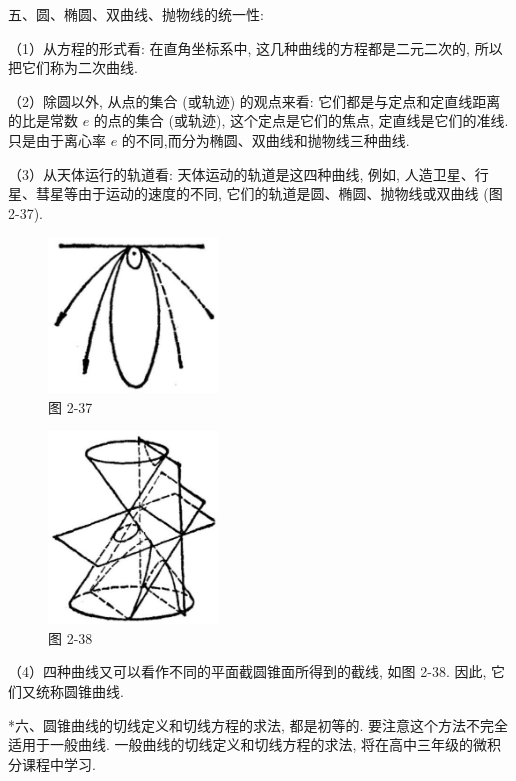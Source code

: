\documentclass[lang=cn,newtx,10pt,scheme=chinese]{elegantbook}
\begin{document}
五、圆、椭圆、双曲线、抛物线的统一性:

（1）从方程的形式看: 在直角坐标系中, 这几种曲线的方程都是二元二次的, 所以把它们称为二次曲线.

（2）除圆以外, 从点的集合 (或轨迹) 的观点来看: 它们都是与定点和定直线距离的比是常数 \(e\) 的点的集合 (或轨迹), 这个定点是它们的焦点, 定直线是它们的准线. 只是由于离心率 \(e\) 的不同,而分为椭圆、双曲线和抛物线三种曲线.

（3）从天体运行的轨道看: 天体运动的轨道是这四种曲线, 例如, 人造卫星、行星、彗星等由于运动的速度的不同, 它们的轨道是圆、椭圆、抛物线或双曲线 (图 2-37).

\begin{figure}[h]
  \centering
  \includegraphics[max width=0.4\textwidth]{images/01912cc2-ffb6-728e-9ae7-b113ff05c64b_128_103138.jpg}
  \caption{图 2-37}
\end{figure}



\begin{figure}[h]
  \centering
  \includegraphics[max width=0.4\textwidth]{images/01912cc2-ffb6-728e-9ae7-b113ff05c64b_128_628194.jpg}
  \caption{图 2-38}
\end{figure}



（4）四种曲线又可以看作不同的平面截圆锥面所得到的截线, 如图 2-38. 因此, 它们又统称圆锥曲线.

*六、圆锥曲线的切线定义和切线方程的求法, 都是初等的. 要注意这个方法不完全适用于一般曲线. 一般曲线的切线定义和切线方程的求法, 将在高中三年级的微积分课程中学习.
\end{document}
